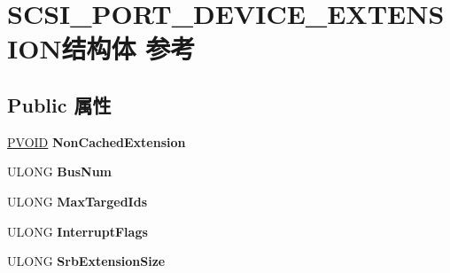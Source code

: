 \hypertarget{struct_s_c_s_i___p_o_r_t___d_e_v_i_c_e___e_x_t_e_n_s_i_o_n}{}\section{S\+C\+S\+I\+\_\+\+P\+O\+R\+T\+\_\+\+D\+E\+V\+I\+C\+E\+\_\+\+E\+X\+T\+E\+N\+S\+I\+O\+N结构体 参考}
\label{struct_s_c_s_i___p_o_r_t___d_e_v_i_c_e___e_x_t_e_n_s_i_o_n}
\subsection*{Public 属性}
\begin{DoxyCompactItemize}
\item 
\mbox{\label{struct_s_c_s_i___p_o_r_t___d_e_v_i_c_e___e_x_t_e_n_s_i_o_n_aab9aa6ae1b796c70e395939a6585c54a}} 
\hyperlink{interfacevoid}{P\+V\+O\+ID} {\bfseries Non\+Cached\+Extension}
\item 
\mbox{\label{struct_s_c_s_i___p_o_r_t___d_e_v_i_c_e___e_x_t_e_n_s_i_o_n_a7e38e5845d041e8212bb852011156c33}} 
U\+L\+O\+NG {\bfseries Bus\+Num}
\item 
\mbox{\label{struct_s_c_s_i___p_o_r_t___d_e_v_i_c_e___e_x_t_e_n_s_i_o_n_ae01587bc92d860580bd778de749b6d01}} 
U\+L\+O\+NG {\bfseries Max\+Targed\+Ids}
\item 
\mbox{\label{struct_s_c_s_i___p_o_r_t___d_e_v_i_c_e___e_x_t_e_n_s_i_o_n_a8ddc6c620d29814e5e53fdf5e52c47df}} 
U\+L\+O\+NG {\bfseries Interrupt\+Flags}
\item 
\mbox{\label{struct_s_c_s_i___p_o_r_t___d_e_v_i_c_e___e_x_t_e_n_s_i_o_n_a7e7da1eddce95b5c91d8c94289d862ef}} 
U\+L\+O\+NG {\bfseries Srb\+Extension\+Size}
\item 
\mbox{\label{struct_s_c_s_i___p_o_r_t___d_e_v_i_c_e___e_x_t_e_n_s_i_o_n_ab334d1354e710d3ec6619a364afffaff}} 

\end{DoxyCompactItemize}
